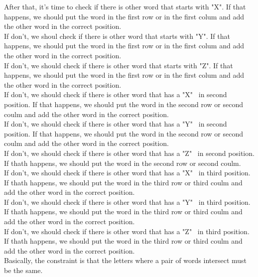 \documentclass[paper=a4, fontsize=11pt]{scrartcl} %
\numberwithin{equation}{section} %
\numberwithin{figure}{section} %
\numberwithin{table}{section} %
\begin{document}
After that, it's time to check if there is other word that starts with "X". If that happens, we should put the word in the first row or in the first colum and add the other word in the correct position.\\
If don't, we shoul check if there is other word that starts with "Y". If that happens, we should put the word in the first row or in the first colum and add the other word in the correct position.\\
 If don't, we should check if there is other word that starts with "Z". If that happens, we should put the word in the first row or in the first colum and add the other word in the correct position. \\
  If don't, we should check if there is other word that has a "X" \ in second position. If that happens, we should put the word in the second row or second coulm and add the other word in the correct position. \\
 If don't, we should check if there is other word that has a "Y" \ in second position. If that happens, we should put the word in the second row or second coulm and add the other word in the correct position. \\
 If don't, we should check if there is other word that has a "Z" \ in second position. If thath happens, we should put the word in the second row or second coulm.\\
  If don't, we should check if there is other word that has a "X" \ in third position. If thath happens, we should put the word in the third row or third coulm and add the other word in the correct position.\\
 If don't, we should check if there is other word that has a "Y" \ in third position. If thath happens, we should put the word in the third row or third coulm and add the other word in the correct position.\\
  If don't, we should check if there is other word that has a "Z" \ in third position. If thath happens, we should put the word in the third row or third coulm and add the other word in the correct position.\\
  
Basically, the constraint is that the letters where a pair of words intersect must be the same.
 


\end{document}
